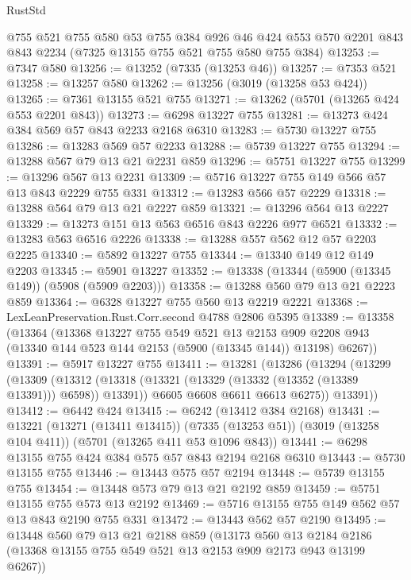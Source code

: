 \begin{lexlean}{RustStd}
\begin{coremodule}
    @755
    @521
    @755
    @580
    @53
    @755
    @384
    @926
    @46
    @424
    @553
    @570
    @2201
    @843
    @843
    @2234
    (@7325 @13155 @755 @521 @755 @580 @755 @384)
@13253 := @7347 @580
@13256 := @13252 (@7335 (@13253 @46))
@13257 := @7353 @521
@13258 := @13257 @580
@13262 := @13256 (@3019 (@13258 @53 @424))
@13265 := @7361 @13155 @521 @755
@13271 := @13262 (@5701 (@13265 @424 @553 @2201 @843))
@13273 := @6298 @13227 @755
@13281 := @13273 @424 @384 @569 @57 @843 @2233 @2168 @6310
@13283 := @5730 @13227 @755
@13286 := @13283 @569 @57 @2233
@13288 := @5739 @13227 @755
@13294 := @13288 @567 @79 @13 @21 @2231 @859
@13296 := @5751 @13227 @755
@13299 := @13296 @567 @13 @2231
@13309 := @5716 @13227 @755 @149 @566 @57 @13 @843 @2229 @755 @331
@13312 := @13283 @566 @57 @2229
@13318 := @13288 @564 @79 @13 @21 @2227 @859
@13321 := @13296 @564 @13 @2227
@13329 := @13273 @151 @13 @563 @6516 @843 @2226 @977 @6521
@13332 := @13283 @563 @6516 @2226
@13338 := @13288 @557 @562 @12 @57 @2203 @2225
@13340 := @5892 @13227 @755
@13344 := @13340 @149 @12 @149 @2203
@13345 := @5901 @13227
@13352 := @13338 (@13344 (@5900 (@13345 @149)) (@5908 (@5909 @2203)))
@13358 := @13288 @560 @79 @13 @21 @2223 @859
@13364 := @6328 @13227 @755 @560 @13 @2219 @2221
@13368 := LexLeanPreservation.Rust.Corr.second @4788 @2806 @5395
@13389 := @13358
    (@13364
      (@13368
        @13227
        @755
        @549
        @521
        @13
        @2153
        @909
        @2208
        @943
        (@13340 @144 @523 @144 @2153 (@5900 (@13345 @144)) @13198)
        @6267))
@13391 := @5917 @13227 @755
@13411 := @13281
    (@13286
      (@13294
        (@13299
          (@13309
            (@13312 (@13318 (@13321 (@13329 (@13332 (@13352 (@13389 @13391))) @6598)) @13391))
            @6605
            @6608
            @6611
            @6613
            @6275))
        @13391))
@13412 := @6442 @424
@13415 := @6242 (@13412 @384 @2168)
@13431 := @13221
    (@13271 (@13411 @13415))
    (@7335 (@13253 @51))
    (@3019 (@13258 @104 @411))
    (@5701 (@13265 @411 @53 @1096 @843))
@13441 := @6298 @13155 @755 @424 @384 @575 @57 @843 @2194 @2168 @6310
@13443 := @5730 @13155 @755
@13446 := @13443 @575 @57 @2194
@13448 := @5739 @13155 @755
@13454 := @13448 @573 @79 @13 @21 @2192 @859
@13459 := @5751 @13155 @755 @573 @13 @2192
@13469 := @5716 @13155 @755 @149 @562 @57 @13 @843 @2190 @755 @331
@13472 := @13443 @562 @57 @2190
@13495 := @13448
    @560
    @79
    @13
    @21
    @2188
    @859
    (@13173
      @560
      @13
      @2184
      @2186
      (@13368 @13155 @755 @549 @521 @13 @2153 @909 @2173 @943 @13199 @6267))

\end{coremodule}
\end{lexlean}
